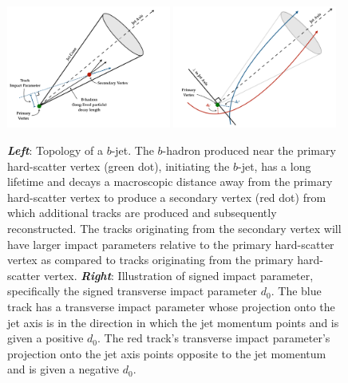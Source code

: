 \begin{figure}[!htb]
    \begin{center}
        \includegraphics[width=0.48\textwidth]{figures/chapter3/ftag/bhadron_decayPDF}
        \includegraphics[width=0.48\textwidth]{figures/chapter3/ftag/bhadron_signed_d0PDF}
        \caption{
            \textbf{\textit{Left}}:
            Topology of a $b$-jet.
            The $b$-hadron produced near the primary hard-scatter vertex (green dot), initiating the
            $b$-jet, has a long lifetime and decays a macroscopic distance away from the primary
            hard-scatter vertex to produce a secondary vertex (red dot) from which additional tracks
            are produced and subsequently reconstructed.
            The tracks originating from the secondary vertex will have larger impact parameters relative
            to the primary hard-scatter vertex as compared to tracks originating from the primary
            hard-scatter vertex.
            \textbf{\textit{Right}}:
            Illustration of signed impact parameter, specifically the signed transverse impact
            parameter $d_0$. The blue track has a transverse impact parameter whose projection onto the jet axis
            is in the direction in which the jet momentum points and is given a positive $d_0$.
            The red track's transverse impact parameter's projection onto the jet axis points opposite to the jet
            momentum and is given a negative $d_0$.
        }
        \label{fig:bjet_decay}
    \end{center}
\end{figure}

